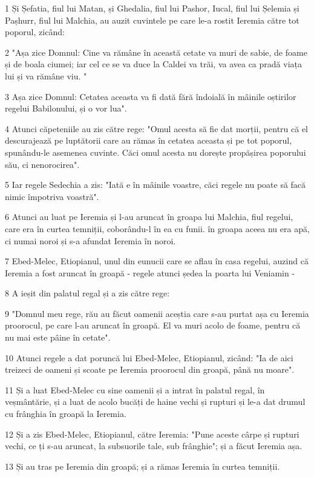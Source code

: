 \par 1 Și Șefatia, fiul lui Matan, și Ghedalia, fiul lui Pashor, Iucal, fiul lui Șelemia și Pașhurr, fiul lui Malchia, au auzit cuvintele pe care le-a rostit Ieremia către tot poporul, zicând:
\par 2 "Așa zice Domnul: Cine va rămâne în această cetate va muri de sabie, de foame și de boala ciumei; iar cel ce se va duce la Caldei va trăi, va avea ca pradă viața lui și va rămâne viu. "
\par 3 Așa zice Domnul: Cetatea aceasta va fi dată fără îndoială în mâinile oștirilor regelui Babilonului, și o vor lua".
\par 4 Atunci căpeteniile au zis către rege: "Omul acesta să fie dat morții, pentru că el descurajează pe luptătorii care au rămas în cetatea aceasta și pe tot poporul, spunându-le asemenea cuvinte. Căci omul acesta nu dorește propășirea poporului său, ci nenorocirea".
\par 5 Iar regele Sedechia a zis: "Iată e în mâinile voastre, căci regele nu poate să facă nimic împotriva voastră".
\par 6 Atunci au luat pe Ieremia și l-au aruncat în groapa lui Malchia, fiul regelui, care era în curtea temniții, coborându-l în ea cu funii. în groapa aceea nu era apă, ci numai noroi și s-a afundat Ieremia în noroi.
\par 7 Ebed-Melec, Etiopianul, unul din eunucii care se aflau în casa regelui, auzind că Ieremia a fost aruncat în groapă - regele atunci ședea la poarta lui Veniamin -
\par 8 A ieșit din palatul regal și a zis către rege:
\par 9 "Domnul meu rege, rău au făcut oamenii aceștia care s-au purtat așa cu Ieremia proorocul, pe care l-au aruncat în groapă. El va muri acolo de foame, pentru că nu mai este pâine în cetate".
\par 10 Atunci regele a dat poruncă lui Ebed-Melec, Etiopianul, zicând: "Ia de aici treizeci de oameni și scoate pe Ieremia proorocul din groapă, până nu moare".
\par 11 Și a luat Ebed-Melec cu sine oamenii și a intrat în palatul regal, în veșmântărie, și a luat de acolo bucăți de haine vechi și rupturi și le-a dat drumul cu frânghia în groapă la Ieremia.
\par 12 Și a zis Ebed-Melec, Etiopianul, către Ieremia: "Pune aceste cârpe și rupturi vechi, ce ți s-au aruncat, la subsuorile tale, sub frânghie"; și a făcut Ieremia așa.
\par 13 Și au tras pe Ieremia din groapă; și a rămas Ieremia în curtea temniții.
